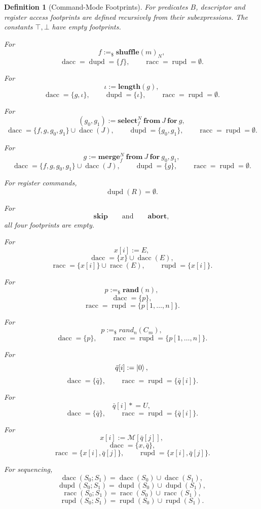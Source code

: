 \documentclass[acmsmall,screen,review,anonymous,nonacm]{acmart}
\newtheorem{definition}{Definition}[section]
\theoremstyle{defn_style}
\newcommand{\asteq}{\mathrel{*}=}
\begin{document}
\begin{definition}[Command-Mode Footprints]
For predicates \(B\), descriptor and register access footprints are defined
recursively from their subexpressions. The constants \(\top,\bot\) have empty
footprints.

For
\[
f:=_{\$}\mathbf{shuffle}(m)_N,
\]
\[
\operatorname{dacc}=\operatorname{dupd}=\{f\},
\qquad
\operatorname{racc}=\operatorname{rupd}=\emptyset.
\]

For
\[
\iota:=\mathbf{length}(g),
\]
\[
\operatorname{dacc}=\{g,\iota\},
\qquad
\operatorname{dupd}=\{\iota\},
\qquad
\operatorname{racc}=\operatorname{rupd}=\emptyset.
\]

For
\[
(g_0,g_1)
:=
\mathbf{select}_{f}^{N}\ \mathbf{from}\ J\ \mathbf{for}\ g,
\]
\[
\operatorname{dacc}
=
\{f,g,g_0,g_1\}
\cup
\operatorname{dacc}(J),
\qquad
\operatorname{dupd}=\{g_0,g_1\},
\qquad
\operatorname{racc}=\operatorname{rupd}=\emptyset.
\]

For
\[
g
:=
\mathbf{merge}_{f}^{N}\ \mathbf{from}\ J\ \mathbf{for}\ g_0,g_1,
\]
\[
\operatorname{dacc}
=
\{f,g,g_0,g_1\}
\cup
\operatorname{dacc}(J),
\qquad
\operatorname{dupd}=\{g\},
\qquad
\operatorname{racc}=\operatorname{rupd}=\emptyset.
\]

For register commands,
\[
\operatorname{dupd}(R)=\emptyset.
\]

For
\[
\mathbf{skip}
\qquad\text{and}\qquad
\mathbf{abort},
\]
all four footprints are empty.

For
\[
x[i]:=E,
\]
\[
\operatorname{dacc}
=
\{x\}\cup\operatorname{dacc}(E),
\]
\[
\operatorname{racc}
=
\{x[i]\}\cup\operatorname{racc}(E),
\qquad
\operatorname{rupd}=\{x[i]\}.
\]

For
\[
p:=_{\$}\mathbf{rand}(n),
\]
\[
\operatorname{dacc}
=
\{p\},
\]
\[
\operatorname{racc}
=
\operatorname{rupd}
=
\{p[1,\ldots,n]\}.
\]

For
\[
p:=_{\$}\textit{rand}_{n}(C_m),
\]
\[
\operatorname{dacc}=\{p\},
\qquad
\operatorname{racc}
=
\operatorname{rupd}
=
\{p[1,\ldots,n]\}.
\]

For
\[
\bar q[i]:=\ket 0,
\]
\[
\operatorname{dacc}=\{\bar q\},
\qquad
\operatorname{racc}=\operatorname{rupd}=\{\bar q[i]\}.
\]

For
\[
\bar q[i]\asteq U,
\]
\[
\operatorname{dacc}=\{\bar q\},
\qquad
\operatorname{racc}=\operatorname{rupd}=\{\bar q[i]\}.
\]

For
\[
x[i]:=\mathcal M[\bar q[j]],
\]
\[
\operatorname{dacc}=\{x,\bar q\},
\]
\[
\operatorname{racc}=\{x[i],\bar q[j]\},
\qquad
\operatorname{rupd}=\{x[i],\bar q[j]\}.
\]

For sequencing,
\[
\operatorname{dacc}(S_0;S_1)
=
\operatorname{dacc}(S_0)\cup\operatorname{dacc}(S_1),
\]
\[
\operatorname{dupd}(S_0;S_1)
=
\operatorname{dupd}(S_0)\cup\operatorname{dupd}(S_1),
\]
\[
\operatorname{racc}(S_0;S_1)
=
\operatorname{racc}(S_0)\cup\operatorname{racc}(S_1),
\]
\[
\operatorname{rupd}(S_0;S_1)
=
\operatorname{rupd}(S_0)\cup\operatorname{rupd}(S_1).
\]


\end{definition}
\end{document}
